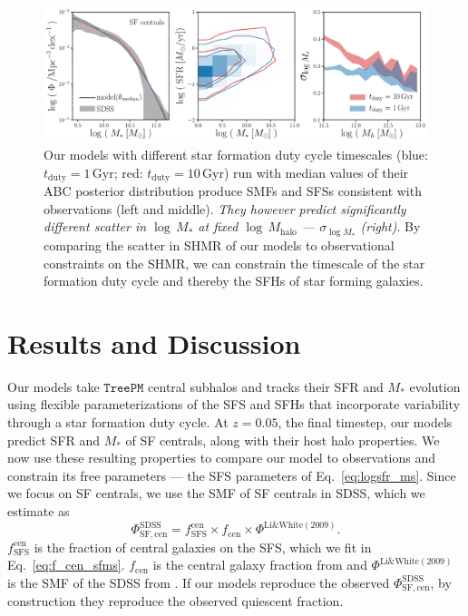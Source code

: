 \documentclass[12pt, letterpaper, preprint, tighten]{aastex62}
\newcommand{\beq}{\begin{equation}}
\newcommand{\eeq}{\end{equation}}
\newcommand{\siglogm}{\sigma_{\log M_*}}
\begin{document}
\begin{figure}
\begin{center}
\includegraphics[width=\textwidth]{figs/qaplot_abc.pdf}
    \caption{Our models with different star formation duty cycle timescales
    (blue: $t_\mathrm{duty}{=}1\,\mathrm{Gyr}$; red: $t_\mathrm{duty}{=}10\,\mathrm{Gyr}$)
    run with median values of their ABC posterior distribution produce SMFs and SFSs consistent
    with observations (left and middle). \emph{They however predict significantly different
    scatter in $\log\,M_*$ at fixed $\log\,M_\mathrm{halo}$ --- $\siglogm$ (right)}.
    By comparing the scatter in SHMR of our models to observational constraints on the SHMR,
    we can constrain the timescale of the star formation duty cycle and thereby the SFHs of star
    forming galaxies.
    }
\label{fig:abc_demo}
\end{center}
\end{figure}

\section{Results and Discussion} \label{sec:results}
Our models take $\mathtt{TreePM}$ central subhalos and tracks their SFR
and $M_*$ evolution using flexible parameterizations of the SFS and SFHs
that incorporate variability through a star formation duty cycle.
At $z = 0.05$, the final timestep, our models predict SFR and $M_*$ of SF
centrals, along with their host halo properties. We now use these resulting
properties to compare our model to observations and constrain its free
parameters --- the SFS parameters of Eq.~\ref{eq:logsfr_ms}. Since we focus
on SF centrals, we use the SMF of SF centrals in SDSS, which we estimate as
\beq \label{eq:smf_sf_cen}
\Phi^\mathrm{SDSS}_\mathrm{SF,cen} = f^\mathrm{cen}_\mathrm{SFS} \times f_\mathrm{cen} \times \Phi^\mathrm{Li\&White(2009)}.
\eeq
$f^\mathrm{cen}_\mathrm{SFS}$ is the fraction of central galaxies on the
SFS, which we fit in Eq.~\ref{eq:f_cen_sfms}. $f_\mathrm{cen}$ is the
central galaxy fraction from \cite{wetzel2013} and $\Phi^\mathrm{Li\&White(2009)}$
is the SMF of the SDSS from \cite{li2009}. If our models reproduce the
observed $\Phi^\mathrm{SDSS}_\mathrm{SF,cen}$, by construction they reproduce
the observed quiescent fraction.
\end{document}
